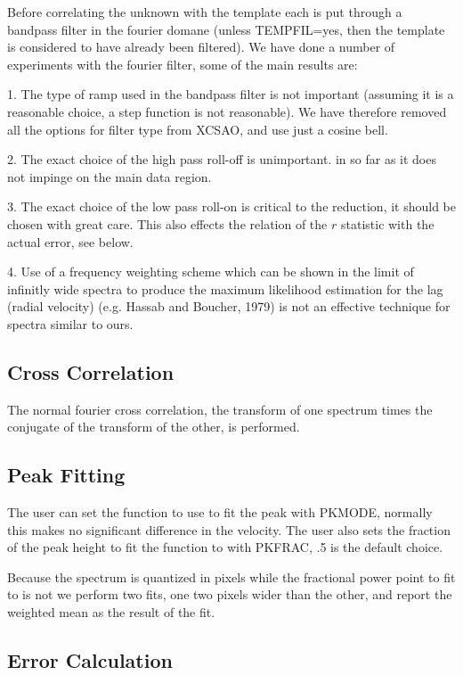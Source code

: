 Before correlating the unknown with the template each is put through a bandpass
filter in the fourier domane (unless TEMPFIL=yes, then the template is
considered to have already been filtered).  We have done a number of
experiments with the fourier filter, some of the main results are:

1.  The type of ramp used in the bandpass filter is not important (assuming it
is a reasonable choice, a step function  is not reasonable).  We have therefore 
removed all the options for filter type from XCSAO, and use just a cosine bell.

2.  The exact choice of the high pass roll-off is unimportant.  in so far as it
does not impinge on the main data region.

3.  The exact choice of the low pass roll-on is critical to the reduction, it
should be chosen with great care.  This also effects the relation of the $r$
statistic with the actual error, see below.

4.  Use of a frequency weighting scheme which can be shown in the limit of
infinitly wide spectra to produce the maximum likelihood estimation for the lag
(radial velocity) (e.g. Hassab and Boucher, 1979) is not an effective technique
for spectra similar to ours.

\subsection{Cross Correlation}

The normal fourier cross correlation, the transform of one spectrum times the
conjugate of the transform of the other, is performed.

\subsection{Peak Fitting}

The user can set the function to use to fit the peak with PKMODE, normally this
makes no significant difference in the velocity.  The user also sets the
fraction of the peak height to fit the function to with PKFRAC, .5 is the
default choice.

Because the spectrum is quantized in pixels while the fractional power point to
fit to is not we perform two fits, one two pixels wider than the other, and
report the weighted mean as the result of the fit.

\subsection{Error Calculation}

